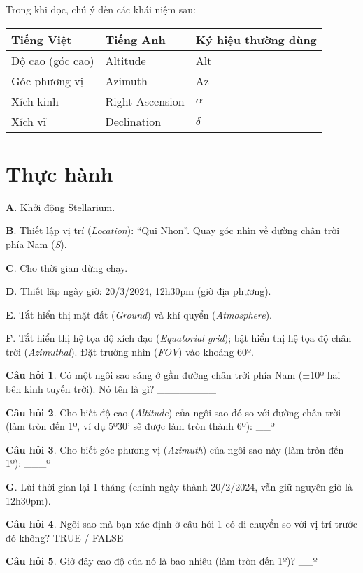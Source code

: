 \documentclass[
  a4paper,
]{book}
\begin{document}
Trong khi đọc, chú ý đến các khái niệm sau:

\begin{longtable}[]{@{}lll@{}}
\toprule\noalign{}
Tiếng Việt & Tiếng Anh & Ký hiệu thường dùng \\
\midrule\noalign{}
\endhead
\bottomrule\noalign{}
\endlastfoot
Độ cao (góc cao) & Altitude & Alt \\
Góc phương vị & Azimuth & Az \\
Xích kinh & Right Ascension & \(\alpha\) \\
Xích vĩ & Declination & \(\delta\) \\
\end{longtable}

\section{Thực hành}\label{thux1ef1c-huxe0nh}

\textbf{A}. Khởi động Stellarium.

\textbf{B}. Thiết lập vị trí (\emph{Location}): ``Qui Nhon''. Quay góc nhìn về đường chân trời phía Nam (\emph{S}).

\textbf{C}. Cho thời gian dừng chạy.

\textbf{D}. Thiết lập ngày giờ: 20/3/2024, 12h30pm (giờ địa phương).

\textbf{E}. Tắt hiển thị mặt đất (\emph{Ground}) và khí quyển (\emph{Atmosphere}).

\textbf{F}. Tắt hiển thị hệ tọa độ xích đạo (\emph{Equatorial grid}); bật hiển thị hệ tọa độ chân trời (\emph{Azimuthal}). Đặt trường nhìn (\emph{FOV}) vào khoảng 60º.

\textbf{Câu hỏi 1}. Có một ngôi sao sáng ở gần đường chân trời phía Nam (±10º hai bên kinh tuyến trời). Nó tên là gì?
\_\_\_\_\_\_\_\_

\textbf{Câu hỏi 2}. Cho biết độ cao (\emph{Altitude}) của ngôi sao đó so với đường chân trời (làm tròn đến 1º, ví dụ 5º30' sẽ được làm tròn thành 6º):
\_\_º

\textbf{Câu hỏi 3}. Cho biết góc phương vị (\emph{Azimuth}) của ngôi sao này (làm tròn đến 1º):
\_\_\_º

\textbf{G}. Lùi thời gian lại 1 tháng (chỉnh ngày thành 20/2/2024, vẫn giữ nguyên giờ là 12h30pm).

\textbf{Câu hỏi 4}. Ngôi sao mà bạn xác định ở câu hỏi 1 có di chuyển so với vị trí trước đó không?
TRUE / FALSE

\textbf{Câu hỏi 5}. Giờ đây cao độ của nó là bao nhiêu (làm tròn đến 1º)?
\_\_º
\end{document}
